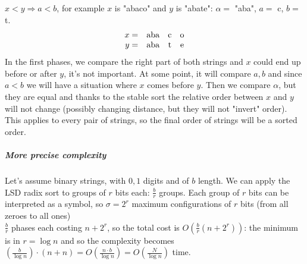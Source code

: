 \documentclass[10pt]{report}
\begin{document}
$x<y\Rightarrow a<b$, for example $x$ is "abaco" and $y$ is "abate": $\alpha =$ "aba", $a=$ c, $b=$ t.
$$\begin{array}{r c c c}
x = & \hbox{aba} & \hbox{c} & \hbox{o}\\
y = & \hbox{aba} & \hbox{t} & \hbox{e}\\
\end{array}$$
In the first phases, we compare the right part of both strings and $x$ could end up before or after $y$, it's not important. At some point, it will compare $a,b$ and since $a< b$ we will have a situation where $x$ comes before $y$. Then we compare $\alpha$, but they are equal and thanks to the stable sort the relative order between $x$ and $y$ will not change (possibly changing distance, but they will not "invert" order). This applies to every pair of strings, so the final order of strings will be a sorted order.
\subparagraph{More precise complexity} Let's assume binary strings, with $0,1$ digits and of $b$ length. We can apply the LSD radix sort to groups of $r$ bits each: $\frac{b}{r}$ groups. Each group of $r$ bits can be interpreted as a symbol, so $\sigma = 2^r$ maximum configurations of $r$ bits (from all zeroes to all ones)\\
$\frac{b}{r}$ phases each costing $n+2^r$, so the total cost is $O(\frac{b}{r}(n+2^r))$: the minimum is in $r=\log n$ and so the complexity becomes $(\frac{b}{\log n})\cdot(n+n) = O\left(\frac{n\cdot b}{\log n}\right) = O\left(\frac{N}{\log n}\right)$ time.
\end{document}
